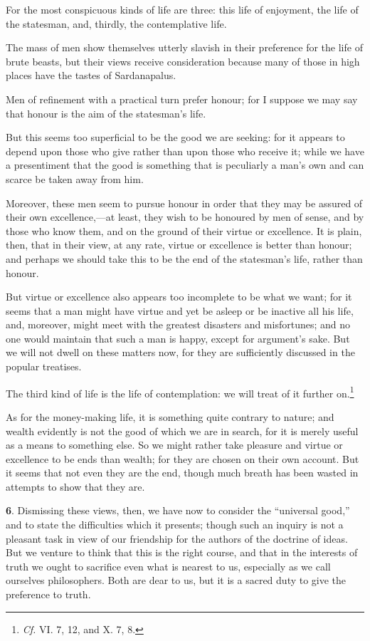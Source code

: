 For the most conspicuous kinds of life are three: this life of
enjoyment, the life of the statesman, and, thirdly, the contemplative
life.

The mass of men show themselves utterly slavish in their preference
for the life of brute beasts, but their views receive consideration
because many of those in high places have the tastes of Sardanapalus.

Men of refinement with a practical turn prefer honour; for I suppose
we may say that honour is the aim of the statesman's life.

But this seems too superficial to be the good we are seeking: for it
appears to depend upon those who give rather than upon those who
receive it; while we have a presentiment that the good is something
that is peculiarly a man's own and can scarce be taken away from him.

Moreover, these men seem to pursue honour in order that they may be
assured of their own excellence,---at least, they wish to be honoured by
men of sense, and by those who know them, and on the ground of their
virtue or excellence. It is plain, then, that in their view, at any
rate, virtue or excellence is better than honour; and perhaps we
should take this to be the end of the statesman's life, rather than
honour.

But virtue or excellence also appears too incomplete to be what we
want; for it seems that a man  might have virtue and yet be
asleep or be inactive all his life, and, moreover, might meet with the
greatest disasters and misfortunes; and no one would maintain that
such a man is happy, except for argument's sake. But we will not dwell
on these matters now, for they are sufficiently discussed in the
popular treatises.

The third kind of life is the life of contemplation: we will treat of
it further on.\footnote{\textit{Cf.} VI. 7, 12, and X. 7, 8.}

As for the money-making life, it is something quite contrary to
nature; and wealth evidently is not the good of which we are in
search, for it is merely useful as a means to something else. So we
might rather take pleasure and virtue or excellence to be ends than
wealth; for they are chosen on their own account. But it seems that
not even they are the end, though much breath has been wasted in
attempts to show that they are.

\textbf{6}. Dismissing these views, then, we have now to consider the
``universal good,'' and to state the difficulties which it presents;
though such an inquiry is not a pleasant task in view of our
friendship for the authors of the doctrine of ideas. But we venture to
think that this is the right course, and that in the interests of
truth we ought to sacrifice even what is nearest to us, especially as
we call ourselves philosophers. Both are dear to us, but it is a
sacred duty to give the preference to truth.

